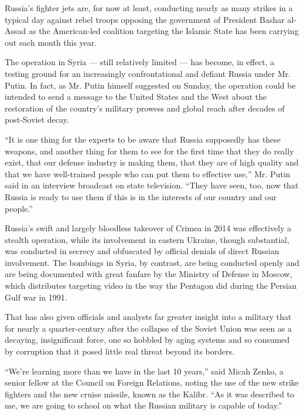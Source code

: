 Russia's fighter jets are, for now at least, conducting nearly as many
strikes in a typical day against rebel troops opposing the government of
President Bashar al-Assad as the American-led coalition targeting the
Islamic State has been carrying out each month this year.

The operation in Syria --- still relatively limited --- has become, in
effect, a testing ground for an increasingly confrontational and defiant
Russia under Mr. Putin. In fact, as Mr. Putin himself suggested on
Sunday, the operation could be intended to send a message to the United
States and the West about the restoration of the country's military
prowess and global reach after decades of post-Soviet decay.

``It is one thing for the experts to be aware that Russia supposedly has
these weapons, and another thing for them to see for the first time that
they do really exist, that our defense industry is making them, that
they are of high quality and that we have well-trained people who can
put them to effective use,'' Mr. Putin said in an interview broadcast on
state television. ``They have seen, too, now that Russia is ready to use
them if this is in the interests of our country and our people.''

Russia's swift and largely bloodless takeover of Crimea in 2014 was
effectively a stealth operation, while its involvement in eastern
Ukraine, though substantial, was conducted in secrecy and obfuscated by
official denials of direct Russian involvement. The bombings in Syria,
by contrast, are being conducted openly and are being documented with
great fanfare by the Ministry of Defense in Moscow, which distributes
targeting video in the way the Pentagon did during the Persian Gulf war
in 1991.

That has also given officials and analysts far greater insight into a
military that for nearly a quarter-century after the collapse of the
Soviet Union was seen as a decaying, insignificant force, one so hobbled
by aging systems and so consumed by corruption that it posed little real
threat beyond its borders.

``We're learning more than we have in the last 10 years,'' said Micah
Zenko, a senior fellow at the Council on Foreign Relations, noting the
use of the new strike fighters and the new cruise missile, known as the
Kalibr. ``As it was described to me, we are going to school on what the
Russian military is capable of today.''

\href{https://www.nytimes3xbfgragh.onion/interactive/2015/10/14/world/europe/russia-frozen-zones-syria.html}{}

